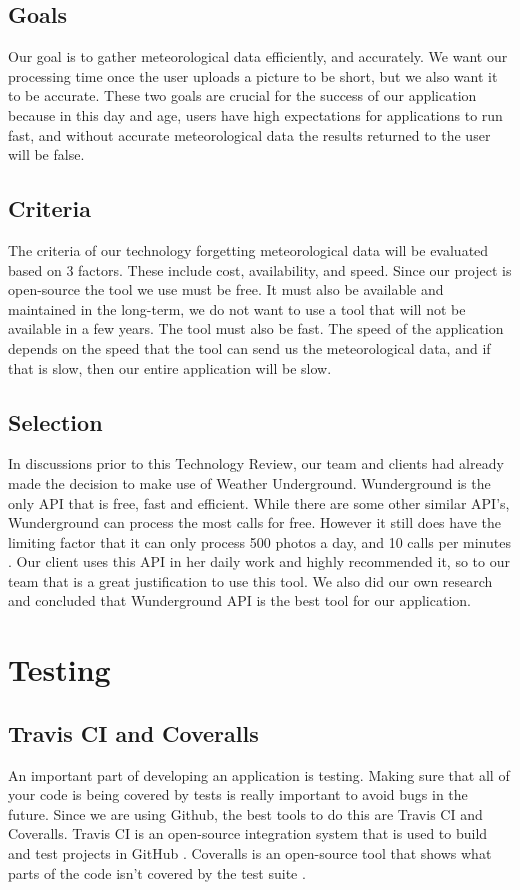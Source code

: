 \documentclass[onecolumn, draftclsnofoot,10pt, compsoc]{IEEEtran}
\begin{document}
\begin{flushleft}
\subsection{Goals}
Our goal is to gather meteorological data efficiently, and accurately. We want our processing time once the user uploads a picture to be short, but we also want it to be accurate. These two goals are crucial for the success of our application because in this day and age, users have high expectations for applications to run fast, and without accurate meteorological data the results returned to the user will be false.





\subsection{Criteria}
The criteria of our technology forgetting meteorological data will be evaluated based on 3 factors. These include cost, availability, and speed. Since our project is open-source the tool we use must be free. It must also be available and maintained in the long-term, we do not want to use a tool that will not be available in a few years. The tool must also be fast. The speed of the application depends on the speed that the tool can send us the meteorological data, and if that is slow, then our entire application will be slow.


\subsection{Selection}
In discussions prior to this Technology Review, our team and clients had already made the decision to make use of Weather Underground. Wunderground is the only API that is free, fast and efficient. While there are some other similar API's, Wunderground can process the most calls for free. However it still does have the limiting factor that it can only process 500 photos a day, and 10 calls per minutes \cite{17}. Our client uses this API in her daily work and highly recommended it, so to our team that is a great justification to use this tool. We  also did our own research and concluded that Wunderground API is the best tool for our application.


\section{Testing}

\subsection{Travis CI and Coveralls}
An important part of developing an application is testing. Making sure that all of your code is being covered by tests is really important to avoid bugs in the future. Since we are using Github, the best tools to do this are Travis CI and Coveralls. Travis CI is an open-source integration system that is used to build and test projects in GitHub \cite{18}. Coveralls is an open-source tool that shows what parts of the code isn't covered by the test suite  \cite{19}.




\end{flushleft}
\end{document}
